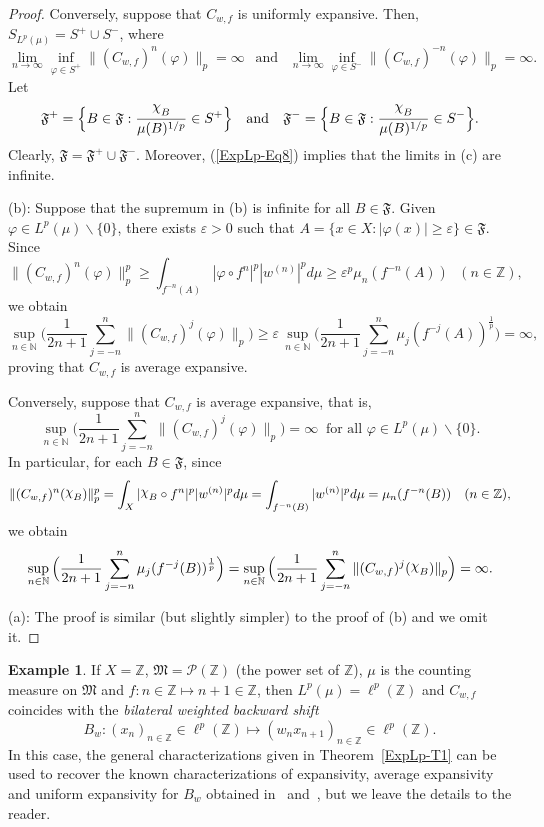 \documentclass[12pt]{article}
\theoremstyle{plain}
\theoremstyle{definition}
\newtheorem{example}[theorem]{Example}%
\newcommand{\N}{\mathbb{N}} %
\newcommand{\Z}{\mathbb{Z}} %
\newcommand{\cP}{\mathcal{P}}
\newcommand{\fF}{\mathfrak{F}}
\newcommand{\fM}{\mathfrak{M}}
\newcommand{\eps}{\varepsilon}
\DeclareRobustCommand{\rchi}{{\mathpalette\irchi\relax}}
\newcommand{\irchi}[2]{\raisebox{\depth}{$#1\chi$}}
\begin{document}
\begin{proof}
Conversely, suppose that $C_{w,f}$ is uniformly expansive. Then, $S_{L^p(\mu)} = S^+ \cup S^-$, where 
\begin{equation}\label{ExpLp-Eq8}
\lim_{n \to \infty} \inf_{\varphi \in S^+} \|(C_{w,f})^n(\varphi)\|_p = \infty \ \ \text{ and } \ \ 
\lim_{n \to \infty} \inf_{\varphi \in S^-} \|(C_{w,f})^{-n}(\varphi)\|_p = \infty.
\end{equation}
Let
\[
\fF^+ = \Big\{B \in \fF : \frac{\rchi_B}{\mu(B)^{1/p}} \in S^+\Big\} \ \ \text{ and } \ \ 
\fF^- = \Big\{B \in \fF : \frac{\rchi_B}{\mu(B)^{1/p}} \in S^-\Big\}.
\]
Clearly, $\fF = \fF^+ \cup \fF^-$. Moreover, (\ref{ExpLp-Eq8}) implies that the limits in (c) are infinite.

\smallskip\noindent
(b): Suppose that the supremum in (b) is infinite for all $B \in \fF$. Given $\varphi \in L^p(\mu) \backslash \{0\}$, 
there exists $\eps >0$ such that $A = \{x \in X : |\varphi(x)| \geq \eps\} \in \fF$. Since 
\[
\|(C_{w,f})^n(\varphi)\|_p^p \geq \int_{f^{-n}(A)} |\varphi \circ f^n|^p |w^{(n)}|^p d\mu \geq \eps^p \mu_n(f^{-n}(A))
\ \ \ (n \in \Z),
\]
we obtain
\[
\sup_{n \in \N} \Big(\frac{1}{2n+1} \sum_{j=-n}^n \|(C_{w,f})^j(\varphi)\|_p\Big) \geq
\eps\, \sup_{n \in \N} \Big(\frac{1}{2n+1} \sum_{j=-n}^n \mu_j(f^{-j}(A))^\frac{1}{p}\Big) = \infty,
\]
proving that $C_{w,f}$ is average expansive.

Conversely, suppose that $C_{w,f}$ is average expansive, that is,
\[
\sup_{n \in \N} \Big(\frac{1}{2n+1} \sum_{j=-n}^n \|(C_{w,f})^j(\varphi)\|_p\Big) = \infty 
  \ \text{ for all } \varphi \in L^p(\mu) \backslash \{0\}.
\]
In particular, for each $B \in \fF$, since
\[
\|(C_{w,f})^n(\rchi_B)\|_p^p = \int_X |\rchi_B \circ f^n|^p |w^{(n)}|^p d\mu = \int_{f^{-n}(B)} |w^{(n)}|^p d\mu = \mu_n(f^{-n}(B))
\ \ \ (n \in \Z),
\]
we obtain
\[
\sup_{n \in \N} \Big(\frac{1}{2n+1} \sum_{j=-n}^n \mu_j(f^{-j}(B))^\frac{1}{p}\Big) =
\sup_{n \in \N} \Big(\frac{1}{2n+1} \sum_{j=-n}^n \|(C_{w,f})^j(\rchi_B)\|_p\Big) = \infty.
\]

\noindent
(a): The proof is similar (but slightly simpler) to the proof of (b) and we omit it.
\end{proof}

\begin{example} \label{ExpLp-Ex1}
If $X = \Z$, $\fM = \cP(\Z)$ (the power set of $\Z$), $\mu$ is the counting measure on $\fM$ and $f : n \in \Z \mapsto n+1 \in \Z$, 
then $L^p(\mu) = \ell^p(\Z)$ and $C_{w,f}$ coincides with the {\em bilateral weighted backward shift}
\[
B_w : (x_n)_{n \in \Z} \in \ell^p(\Z) \mapsto (w_nx_{n+1})_{n \in \Z} \in \ell^p(\Z).
\]
In this case, the general characterizations given in Theorem~\ref{ExpLp-T1} can be used to recover the known characterizations
of expansivity, average expansivity and uniform expansivity for $B_w$ obtained in~\cite{AlvBerMes21} and~\cite{BerCirDarMesPuj18},
but we leave the details to the reader.
\end{example}
\end{document}
